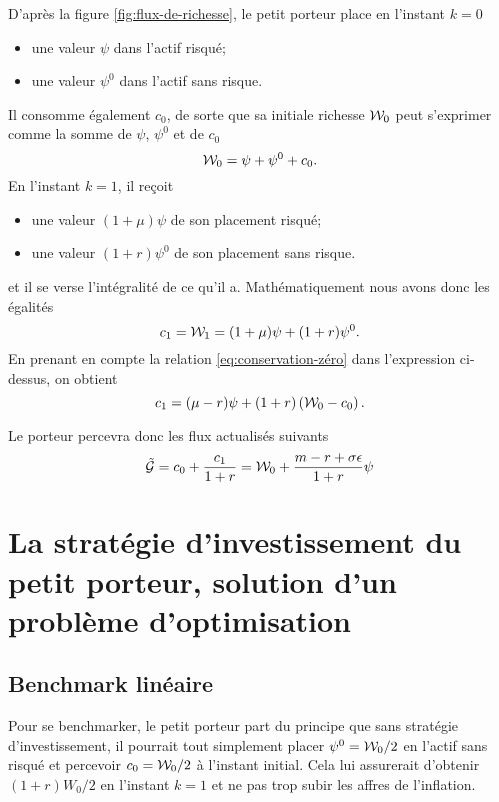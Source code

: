 \documentclass{article}
\numberwithin{equation}{section}
\begin{document}
D'après la figure \ref{fig:flux-de-richesse}, le petit porteur place en l'instant $k = 0$
\begin{itemize}
\item une valeur $\psi$ dans l'actif risqué;
\item une valeur $\psi^0$ dans l'actif sans risque.
\end{itemize}
Il consomme également $c_0$, de sorte que sa initiale richesse $\mathcal{W}_0$ peut s'exprimer comme la somme de $\psi$, $\psi^0$ et de $c_0$
\begin{equation}\label{eq:conservation-zéro}
\mathcal{W}_0 = \psi + \psi^0 + c_0.
\end{equation}
En l'instant $k = 1$, il reçoit 
\begin{itemize}
\item une valeur $(1 + \mu)\psi$ de son placement risqué;
\item une valeur $(1 + r)\psi^0$ de son placement sans risque.
\end{itemize}
et il se verse l'intégralité de ce qu'il a. Mathématiquement nous avons donc les égalités
$$
c_ 1 = \mathcal{W}_1 = (1 + \mu)\psi + (1 + r)\psi^0.
$$
En prenant en compte la relation \eqref{eq:conservation-zéro} dans l'expression ci-dessus, on obtient
\begin{equation}
c_1 = (\mu - r)\psi + (1 + r)\left(\mathcal{W}_0 - c_0\right).
\end{equation}

Le porteur percevra donc les flux actualisés suivants
\begin{equation}
\tilde{\mathcal{G}} = c_0 + \frac{c_1}{1 + r} = \mathcal{W}_0 + \frac{m - r + \sigma\epsilon}{1 + r}\psi
\end{equation}

\section{La stratégie d'investissement du petit porteur, solution d'un problème d'optimisation}

\subsection{Benchmark linéaire}

Pour se benchmarker, le petit porteur part du principe que sans stratégie d'investissement, il pourrait tout simplement placer $\psi^0 = \mathcal{W}_0/2$ en l'actif sans risqué et percevoir $c_0 = \mathcal{W}_0/2$ à l'instant initial. Cela lui assurerait d'obtenir $(1 + r)W_0/2$ en l'instant $k = 1$ et ne pas trop subir les affres de l'inflation.\\
\end{document}
